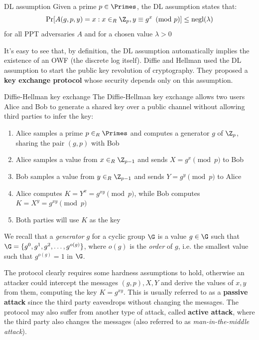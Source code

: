 \documentclass[a4paper, 12pt]{report}
\begin{document}
    \begin{framedass}{DL assumption}
        Given a prime $p \in \Primes$, the DL assumption states that:
        \[\Pr[A(g,p,y) = x : x \in_R \Z_p, y \equiv g^x \pmod p] \leq \mathrm{negl}(\lambda)\]
        for all PPT adversaries $A$ and for a chosen value $\lambda > 0$
    \end{framedass}

    It's easy to see that, by definition, the DL assumption automatically implies the existence of an OWF (the discrete log itself). Diffie and Hellman used the DL assumption to start the public key revolution of cryptography. They proposed a \textbf{key exchange protocol} whose security depends only on this assumption.

    \begin{framedalgo}{Diffie-Hellman key exchange}
        The Diffie-Hellman key exchange allows two users Alice and Bob to generate a shared key over a public channel without allowing third parties to infer the key:
        \begin{enumerate}
            \item Alice samples a prime $p \in_R \Primes$ and computes a generator $g$ of $\Z_p$, sharing the pair $(g,p)$ with Bob
            \item Alice samples a value from $x \in_R \Z_{p-1}$ and sends $X = g^{x} \pmod p$ to Bob
            \item Bob samples a value from $y \in_R \Z_{p-1}$ and sends $Y = g^{y} \pmod p$ to Alice
            \item Alice computes $K = Y^x = g^{xy} \pmod p$, while Bob computes $K = X^y = g^{xy} \pmod p$
            \item Both parties will use $K$ as the key
        \end{enumerate}
    \end{framedalgo}

    We recall that a \textit{generator} $g$ for a cyclic group $\G$ is a value $g \in \G$ such that $\G = \{g^{0}, g^1, g^2, \ldots, g^{o(g)}\}$, where $o(g)$ is the \textit{order} of $g$, i.e. the smallest value such that $g^{o(g)} = 1$ in $\G$.

    The protocol clearly requires some hardness assumptions to hold, otherwise an attacker could intercept the messages $(g,p), X, Y$ and derive the values of $x,y$ from them, computing the key $K = g^{xy}$. This is usually referred to as a \textbf{passive attack} since the third party eavesdrops without changing the messages. The protocol may also suffer from another type of attack, called \textbf{active attack}, where the third party also changes the messages (also referred to as \textit{man-in-the-middle attack}).
    
\end{document}
